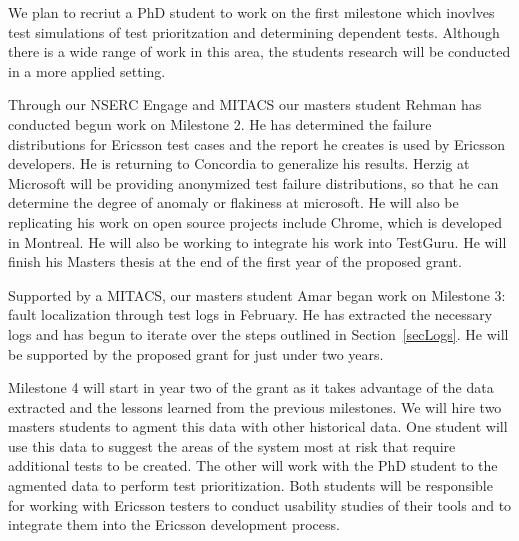 
We plan to recriut a PhD student to work on the first milestone which inovlves test simulations of test prioritzation and determining dependent tests. Although there is a wide range of work in this area, the students research will be conducted in a more applied setting.

Through our NSERC Engage and MITACS our masters student Rehman has conducted begun work on Milestone 2. He has determined the failure distributions for Ericsson test cases and the report he creates is used by Ericsson developers. He is returning to Concordia to generalize his results. Herzig at Microsoft will be providing anonymized test failure distributions, so that he can determine the degree of anomaly or flakiness at microsoft. He will also be replicating his work on open source projects include Chrome, which is developed in Montreal. He will also be working to integrate his work into TestGuru. He will finish his Masters thesis at the end of the first year of the proposed grant.

Supported by a MITACS, our masters student Amar began work on Milestone 3: fault localization through test logs in February. He has extracted the necessary logs and has begun to iterate over the steps outlined in Section~\ref{secLogs}. He will be supported by the proposed grant for just under two years.

Milestone 4 will start in year two of the grant as it takes advantage of the data extracted and the lessons learned from the previous milestones. We will hire two masters students to agment this data with other historical data. One student will use this data to suggest the areas of the system most at risk that require additional tests to be created. The other will work with the PhD student to the agmented data to perform test prioritization. Both students will be responsible for working with Ericsson testers to conduct usability studies of their tools and to integrate them into the Ericsson development process.


